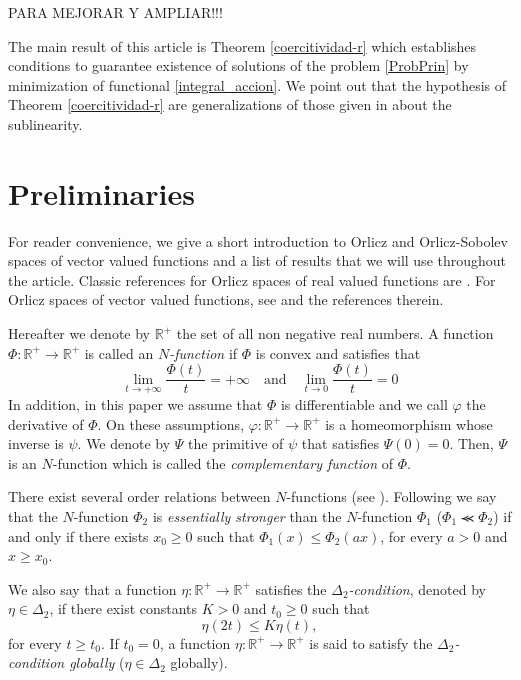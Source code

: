 \documentclass[twoside]{article}
\theoremstyle{remark}
\renewcommand{\leq}{\leqslant}
\renewcommand{\geq}{\geqslant}
\begin{document}
PARA MEJORAR Y AMPLIAR!!!

The main result of this article is Theorem \ref{coercitividad-r} which establishes conditions to guarantee existence of 
solutions of the problem \eqref{ProbPrin} by minimization of functional \eqref{integral_accion}. 
We point out that the hypothesis of
Theorem \ref{coercitividad-r} are generalizations of those given in 
\cite{wu1999periodic,zhao2004periodic,zhao2005existence,tang2010periodic} about the sublinearity.


\section{Preliminaries}\label{preliminares}

For reader convenience, we give a short introduction to Orlicz and Orlicz-Sobolev spaces of vector valued functions and a  list  of results that we will use throughout the article. 
Classic references for Orlicz spaces of real valued functions are \cite{adams_sobolev,KR,rao1991theory}.
For  Orlicz spaces of vector valued functions, see \cite{Orliczvectorial2005} and the references therein.

Hereafter we denote  by $\mathbb{R}^+$  the set of all non negative real numbers. A function $\Phi:\mathbb{R}^+\to \mathbb{R}^+ $ is called an \emph{$N$-function} if $\Phi$ is convex and satisfies that
\[
\lim_{t\to+\infty}\frac{\Phi(t)}{t}=+\infty\quad\text{and}\quad \lim_{t\to 0}\frac{\Phi(t)}{t}=0
\]
In addition,  in this paper  we assume that $\Phi$ is differentiable and we call $\varphi$  the derivative of $\Phi$. 
On these assumptions, $\varphi:\mathbb{R}^+\rightarrow \mathbb{R}^+$ is a homeomorphism whose inverse is $\psi$. 
We denote by $\Psi$ the primitive of $\psi$ that satisfies $\Psi(0)=0$. Then, $\Psi$ is an $N$-function which  is called the \emph{complementary function} of $\Phi$.


There exist several order relations between $N$-functions (see \cite[Sec. 2.2]{rao1991theory}). 
Following \cite[Def. 1, p. 15]{rao1991theory} we say that the $N$-function $\Phi_2$ is \emph{essentially stronger} than the $N$-function  $\Phi_1$  ($\Phi_1\llcurly\Phi_2$) if and only if there exists $x_0\geq 0$ such that $\Phi_1(x)\leq \Phi_2(ax)$, for every $a>0$ and $x\geq x_0$.



We also say that a function $\eta:\mathbb{R}^+\rightarrow \mathbb{R}^+$ satisfies the  \emph{$\Delta_2$-condition}, denoted by $\eta \in \Delta_2$,
if there exist  constants $K>0$ and  $t_0\geq 0$ such that 
\begin{equation}\label{delta2defi}\eta(2t)\leq K\eta(t),
\end{equation}
for every $t\geq t_0$. 
If $t_0=0$,  a function   $\eta:\mathbb{R}^+\rightarrow \mathbb{R}^+$ is said to satisfy the \emph{$\Delta_2$-condition globally} ($\eta \in \Delta_2$ globally).
\end{document}
